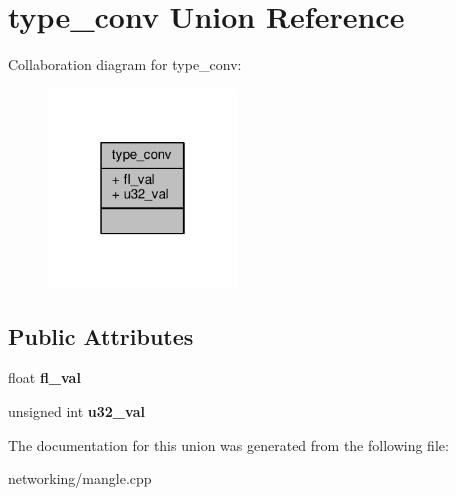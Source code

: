 \hypertarget{uniontype__conv}{}\section{type\+\_\+conv Union Reference}
\label{uniontype__conv}


Collaboration diagram for type\+\_\+conv\+:
\nopagebreak
\begin{figure}[H]
\begin{center}
\leavevmode
\includegraphics[width=142pt]{d4/d60/uniontype__conv__coll__graph}
\end{center}
\end{figure}
\subsection*{Public Attributes}
\begin{DoxyCompactItemize}
\item 
float {\bfseries fl\+\_\+val}\hypertarget{uniontype__conv_a39cbe06a52da6be06398988361be644a}{}\label{uniontype__conv_a39cbe06a52da6be06398988361be644a}

\item 
unsigned int {\bfseries u32\+\_\+val}\hypertarget{uniontype__conv_a83375f1b1b0786e827149d76e8624dc1}{}\label{uniontype__conv_a83375f1b1b0786e827149d76e8624dc1}

\end{DoxyCompactItemize}


The documentation for this union was generated from the following file\+:\begin{DoxyCompactItemize}
\item 
networking/mangle.\+cpp\end{DoxyCompactItemize}
